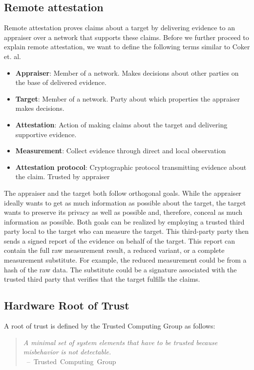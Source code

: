 \subsection{Remote attestation}Remote attestation proves claims about a target
by delivering evidence to an appraiser over a network that supports these
claims. Before we further proceed to explain remote attestation, we want to
define the following terms similar to Coker et. al.\cite{coker_principles_2011}
\begin{itemize}
    \item \textbf{Appraiser}: Member of a network. Makes decisions about other
          parties on the base of delivered evidence.
    \item \textbf{Target}: Member of a network. Party about which properties the
          appraiser makes decisions.
    \item \textbf{Attestation}: Action of making claims about the target and
          delivering supportive evidence.
    \item \textbf{Measurement}: Collect evidence through direct and local
          observation
    \item \textbf{Attestation protocol}: Cryptographic protocol transmitting
          evidence about the claim. Trusted by appraiser
\end{itemize}

The appraiser and the target both follow orthogonal goals. While the appraiser
ideally wants to get as much information as possible about the target, the
target wants to preserve its privacy as well as possible and, therefore, conceal
as much information as possible. Both goals can be realized by employing a
trusted third party local to the target who can measure the target. This
third-party party then sends a signed report of the evidence on behalf of the
target. This report can contain the full raw measurement result, a reduced
variant, or a complete measurement substitute. For example, the reduced
measurement could be from a hash of the raw data. The substitute could be a
signature associated with the trusted third party that verifies that the target
fulfills the claims.

\subsection{Hardware Root of Trust}
\label{sec:20:hardware_root_of_trust}
A root of trust is defined by the Trusted Computing Group as follows:
\begin{quote}
    \textit{ A minimal set of system elements that have to be trusted because
        misbehavior is not detectable. \\
    } \mbox{ -- Trusted Computing Group\cite{tpm_architecture}}
\end{quote}

